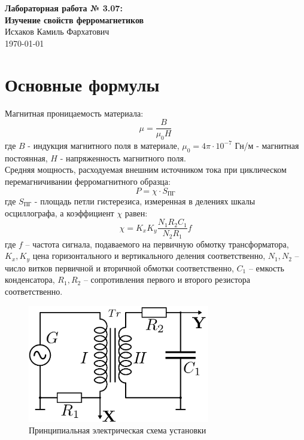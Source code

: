 \documentclass{article}%
\begin{document}
%
\normalsize%
\begin{center}%
\vspace*{\fill}%
{\LARGE\textbf{Лабораторная работа № 3.07: \\ Изучение свойств ферромагнетиков}}\\[1cm]%
{\Large Исхаков Камиль Фархатович}\\[1cm]%
{\Large \today}%
\vspace*{\fill}%
\end{center}%
\newpage%
\section{Основные формулы}%
\label{sec:}%
Магнитная проницаемость материала:\begin{displaymath}\mu=\frac{B}{\mu_0 H}\end{displaymath}%
\newline%
где $B$ - индукция магнитного поля в материале, $\mu_0 = 4 \pi \cdot 10^{-7}$ Гн/м - магнитная постоянная, $H$ -  напряженность магнитного поля.\\%
Средняя мощность, расходуемая внешним источником тока при циклическом перемагничивании ферромагнитного образца:\begin{displaymath}P = \chi \cdot S_{\text{ПГ}}\end{displaymath}%
\newline%
где $S_{\text{ПГ}}$ - площадь петли гистерезиса, измеренная в делениях шкалы осциллографа, а коэффициент $\chi$ равен: $$\chi = K_x K_y \frac{N_1 R_2 C_1}{N_2 R_1}f$$где $f$ – частота сигнала, подаваемого на первичную обмотку трансформатора, $K_x, K_y$ цена горизонтального и вертикального деления соответственно, $N_1, N_2$ – число витков первичной и вторичной обмотки соответственно,  $C_1$ – емкость конденсатора, $R_1, R_2$ – сопротивления первого и второго резистора соответственно.\\%


\begin{figure}[h!]%
\centering%
\includegraphics[width=300px]{lab3_07_p1.png}%
\caption{Принципиальная электрическая схема установки}%
\end{figure}
\end{document}
